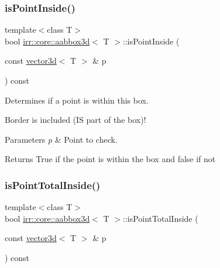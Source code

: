 \subsubsection{\texorpdfstring{is\+Point\+Inside()}{isPointInside()}\hspace{0.1cm}{\footnotesize\ttfamily [2/2]}}
{\footnotesize\ttfamily template$<$class T$>$ \\
bool \hyperlink{classirr_1_1core_1_1aabbox3d}{irr\+::core\+::aabbox3d}$<$ T $>$\+::is\+Point\+Inside (\begin{DoxyParamCaption}\item[{const \hyperlink{classirr_1_1core_1_1vector3d}{vector3d}$<$ T $>$ \&}]{p }\end{DoxyParamCaption}) const\hspace{0.3cm}{\ttfamily [inline]}}



Determines if a point is within this box. 

Border is included (IS part of the box)! 
\begin{DoxyParams}{Parameters}
{\em p} & Point to check. \\
\hline
\end{DoxyParams}
\begin{DoxyReturn}{Returns}
True if the point is within the box and false if not 
\end{DoxyReturn}
\mbox{\label{classirr_1_1core_1_1aabbox3d_a0be7a03228c7af1e6c563acea4af316e}} 
\subsubsection{\texorpdfstring{is\+Point\+Total\+Inside()}{isPointTotalInside()}\hspace{0.1cm}{\footnotesize\ttfamily [1/2]}}
{\footnotesize\ttfamily template$<$class T$>$ \\
bool \hyperlink{classirr_1_1core_1_1aabbox3d}{irr\+::core\+::aabbox3d}$<$ T $>$\+::is\+Point\+Total\+Inside (\begin{DoxyParamCaption}\item[{const \hyperlink{classirr_1_1core_1_1vector3d}{vector3d}$<$ T $>$ \&}]{p }\end{DoxyParamCaption}) const\hspace{0.3cm}{\ttfamily [inline]}}



